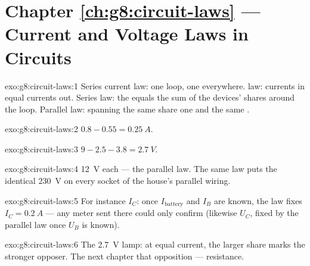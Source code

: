 \section*{Chapter \ref{ch:g8:circuit-laws} --- Current and Voltage Laws in Circuits}

\begin{solution}{exo:g8:circuit-laws:1}
Series current law: one loop, one  everywhere.
 law: currents in equal currents out. Series 
law: the   equals the sum of the devices'
shares around the loop. Parallel  law:  spanning
the same  share one and the same .
\end{solution}

\begin{solution}{exo:g8:circuit-laws:2}
$0.8 - 0.55 = \qty{0.25}{A}$.
\end{solution}

\begin{solution}{exo:g8:circuit-laws:3}
$9 - 2.5 - 3.8 = \qty{2.7}{V}$.
\end{solution}

\begin{solution}{exo:g8:circuit-laws:4}
\qty{12}{V} each --- the parallel  law. The same law
puts the identical \qty{230}{V} on every socket of the house's
parallel wiring.
\end{solution}

\begin{solution}{exo:g8:circuit-laws:5}
For instance $I_C$: once $I_{\text{battery}}$ and $I_B$ are
known, the  law fixes $I_C = \qty{0.2}{A}$ --- any
meter sent there could only confirm (likewise $U_C$, fixed by
the parallel  law once $U_B$ is known).
\end{solution}

\begin{solution}{exo:g8:circuit-laws:6}
The \qty{2.7}{V} lamp: at equal current, the larger 
share marks the stronger opposer. The next chapter 
that opposition --- resistance.
\end{solution}

